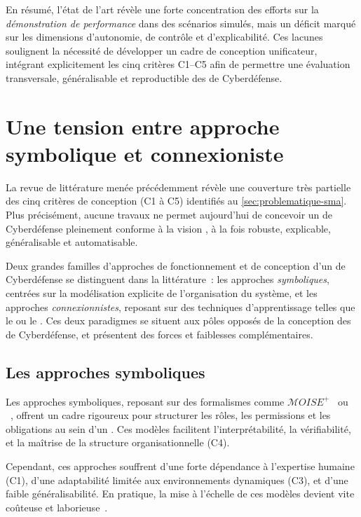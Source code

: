 \noindent
En résumé, l'état de l'art révèle une forte concentration des efforts sur la \emph{démonstration de performance} dans des scénarios simulés, mais un déficit marqué sur les dimensions d'autonomie, de contrôle et d'explicabilité. Ces lacunes soulignent la nécessité de développer un cadre de conception unificateur, intégrant explicitement les cinq critères C1--C5 afin de permettre une évaluation transversale, généralisable et reproductible des  de Cyberdéfense.



\section{Une tension entre approche symbolique et connexioniste}\label{sec:limits-existing}

La revue de littérature menée précédemment révèle une couverture très partielle des cinq critères de conception (C1 à C5) identifiés au \autoref{sec:problematique-sma}. Plus précisément, aucune travaux ne permet aujourd'hui de concevoir un  de Cyberdéfense pleinement conforme à la vision , à la fois robuste, explicable, généralisable et automatisable.

Deux grandes familles d'approches de fonctionnement et de conception d'un  de Cyberdéfense se distinguent dans la littérature~: les approches \textit{symboliques}, centrées sur la modélisation explicite de l'organisation du système, et les approches \textit{connexionnistes}, reposant sur des techniques d'apprentissage telles que le  ou le . Ces deux paradigmes se situent aux pôles opposés de la conception des  de Cyberdéfense, et présentent des forces et faiblesses complémentaires.

\subsection{Les approches symboliques}

Les approches symboliques, reposant sur des formalismes comme $\mathcal{M}OISE^+$~\cite{hubner2002moise} ou ~\cite{Ferber2004}, offrent un cadre rigoureux pour structurer les rôles, les permissions et les obligations au sein d'un . Ces modèles facilitent l'interprétabilité, la vérifiabilité, et la maîtrise de la structure organisationnelle (C4).

Cependant, ces approches souffrent d'une forte dépendance à l'expertise humaine (C1), d'une adaptabilité limitée aux environnements dynamiques (C3), et d'une faible généralisabilité. En pratique, la mise à l'échelle de ces modèles devient vite coûteuse et laborieuse~\cite{Picard2006}.

